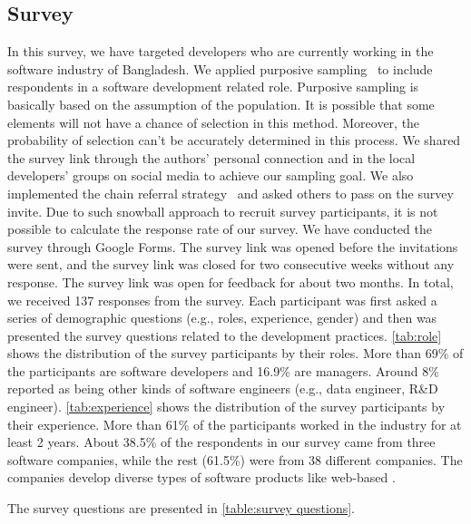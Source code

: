 \subsection{Survey}
\label{survey_participants}

In this survey, we have targeted developers who are currently working in the
software industry of Bangladesh. We applied purposive sampling~\cite{Vogt2005} to
include respondents in a software development related role. Purposive sampling
is basically based on the assumption of the population. It is possible that some
elements will not have a chance of selection in this method. Moreover, the
probability of selection can't be accurately determined in this process. We
shared the survey link through the authors' personal connection and in the local
developers' groups on social media to achieve our sampling goal. We also
implemented the chain referral strategy~\cite{creswell2013} and asked others to
pass on the survey invite. Due to such snowball approach to recruit survey participants, it is not possible to calculate the
response rate of our survey. We have conducted the survey through Google Forms. The survey link was opened
before the invitations were sent, and the survey link was closed for two
consecutive weeks without any response. The survey link was open for feedback
for about two months. In total, we
received 137 responses from the survey. Each participant was first asked a series of demographic questions (e.g., roles, experience, gender) and 
then was presented the survey questions related to the development practices. \tbl\ref{tab:role} shows the distribution of the survey participants by their roles. More than 69\% of the participants 
are software developers and 16.9\% are managers. Around 8\% reported as being other kinds of software engineers (e.g., data engineer, R\&D engineer). 
\tbl\ref{tab:experience} shows the distribution of the survey participants by their experience. More than 61\% of the participants worked in the
industry for at least 2 years. About 38.5\% of the respondents in our survey came from three software companies, while the rest (61.5\%) were from 38 
different companies. The companies develop diverse types of software products like web-based . 

The survey questions are presented in \tbl\ref{table:survey questions}.
 



